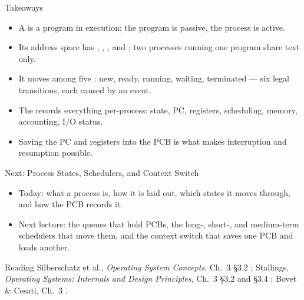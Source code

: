 \documentclass[aspectratio=169]{beamer}
\begin{document}
\begin{frame}{Takeaways}
  \begin{itemize}
    \item A  is a program in execution; the program is passive,
      the process is active.
    \item Its address space has , , , and
      ; two processes running one program share text only.
    \item It moves among five : new, ready, running, waiting,
      terminated --- six legal transitions, each caused by an event.
    \item The  records everything per-process: state, PC,
      registers, scheduling, memory, accounting, I/O status.
    \item Saving the PC and registers into the PCB is what makes interruption
      and resumption possible.
  \end{itemize}
\end{frame}

\begin{frame}{Next: Process States, Schedulers, and Context Switch}
  \begin{itemize}
    \item Today: what a process is, how it is laid out, which states it moves
      through, and how the PCB records it.
    \item Next lecture: the queues that hold PCBs, the long-, short-, and
      medium-term schedulers that move them, and the context switch that saves
      one PCB and loads another.
  \end{itemize}
  \vspace{0.3cm}
  \begin{block}{Reading}
    Silberschatz et al., \emph{Operating System Concepts}, Ch.~3 \S3.2
    \cite{SilberschatzOSC_operating_system_concepts}; Stallings,
    \emph{Operating Systems: Internals and Design Principles}, Ch.~3 \S3.2 and
    \S3.4 \cite{StallingsOS_internals_design_principles}; Bovet \& Cesati,
    Ch.~3 \cite{BovetCesati_understanding_linux_kernel}.
  \end{block}
\end{frame}
\end{document}
